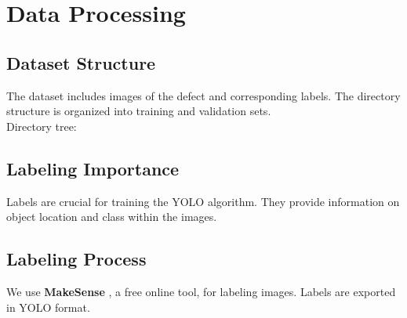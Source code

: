 \documentclass[12pt,a4paper]{article}
\begin{document}
\newpage

\section{Data Processing}
\subsection{Dataset Structure}
The dataset includes images of the defect and corresponding labels. The directory structure is organized into training and validation sets.
\\
Directory tree:
{}


\subsection{Labeling Importance}
Labels are crucial for training the YOLO algorithm. They provide information on object location and class within the images. 
\subsection{Labeling Process}
We use {\textbf {MakeSense}}{ \scriptsize \cite{labelingTool3}}, a free online tool, for labeling images. Labels are exported in YOLO format.
\end{document}
